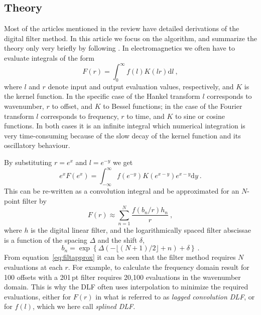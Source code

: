 \documentclass[a4paper, twoside, parskip, 10pt]{scrartcl}
\newcommand{\mr}[1]{\mathrm{#1}}
\begin{document}
\begin{multicols}{2}
\section{Theory}
Most of the articles mentioned in the review have detailed derivations of the
digital filter method. In this article we focus on the algorithm, and summarize
the theory only very briefly by following \cite{GEO.12.Key}. In
electromagnetics we often have to evaluate integrals of the form
%
\begin{equation}
  F(r) = \int^\infty_0 f(l)K(l r)\mr{d}l \ ,
  \label{eq:HankelInt}
\end{equation}
%
where $l$ and $r$ denote input and output evaluation values, respectively, and
$K$ is the kernel function. In the specific case of the Hankel transform $l$
corresponds to wavenumber, $r$ to offset, and $K$ to Bessel functions; in the
case of the Fourier transform $l$ corresponds to frequency, $r$ to time, and
$K$ to sine or cosine functions. In both cases it is an infinite integral which
numerical integration is very time-consuming because of the slow decay of the
kernel function and its oscillatory behaviour.

By substituting $r = e^x$ and $l = e^{-y}$ we get
%
\begin{equation}
  e^x F(e^x) = \int^\infty_{-\infty} f(e^{-y})K(e^{x-y})e^{x-y}\mr{d}y\ .
  \label{eq:filtint}
\end{equation}
%
This can be re-written as a convolution integral and be approximated for an
$N$-point filter by
%
\begin{equation}
  F(r) \approx \sum^N_{n=1} \frac{f(b_n/r) h_n}{r}\ ,
  \label{eq:filtapprox}
\end{equation}
%
where $h$ is the digital linear filter, and the logarithmically spaced filter
abscissae is a function of the spacing $\Delta$ and the shift $\delta$,
%
\begin{equation}
  b_n = \exp\left\{\Delta(-\lfloor{(N+1)/2\rfloor}+n) + \delta\right\} \ .
  \label{eq:base}
\end{equation}
%
From equation~\ref{eq:filtapprox} it can be seen that the filter method
requires $N$ evaluations at each $r$. For example, to calculate the frequency
domain result for 100 offsets with a 201\,pt filter requires 20,100 evaluations
in the wavenumber domain. This is why the DLF often uses interpolation to
minimize the required evaluations, either for $F(r)$ in what is referred to as
\emph{lagged convolution DLF}, or for $f(l)$, which we here call \emph{splined
DLF}.


\end{multicols}
\end{document}
